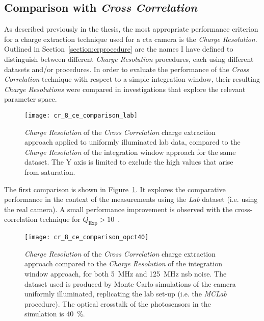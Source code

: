 \subsection{Comparison with \textit{Cross Correlation}}

As described previously in the thesis, the most appropriate performance criterion for a charge extraction technique used for a \gls{cta} camera is the \textit{Charge Resolution}. Outlined in Section~\ref{section:crprocedure} are the names I have defined to distinguish between different \textit{Charge Resolution} procedures, each using different datasets and/or procedures. In order to evaluate the performance of the \textit{Cross Correlation} technique with respect to a simple integration window, their resulting \textit{Charge Resolutions} were compared in investigations that explore the relevant parameter space.

\begin{figure}
  \texttt{[image: cr\_8\_ce\_comparison\_lab]}
  \caption[\textit{Charge Resolution} comparison between \textit{Cross Correlation} and \textit{Window Integration} for \textit{Lab} data.]{\textit{Charge Resolution} of the \textit{Cross Correlation} charge extraction approach applied to uniformly illuminated lab data, compared to the \textit{Charge Resolution} of the integration window approach for the same dataset. The Y axis is limited to exclude the high values that arise from saturation.}
  \label{fig:cr_8_ce_comparison_lab}
\end{figure}

The first comparison is shown in Figure~\ref{fig:cr_8_ce_comparison_lab}. It explores the comparative performance in the context of the measurements using the \textit{Lab} dataset (i.e. using the real camera). A small performance improvement is observed with the cross-correlation technique for $Q_\text{Exp} > 10$~\si{\pe}.

\begin{figure}
  \texttt{[image: cr\_8\_ce\_comparison\_opct40]}
  \caption[\textit{Charge Resolution} comparison between \textit{Cross Correlation} and \textit{Window Integration} for \textit{MCLab} data with an optical crosstalk of \SI{40}{\percent}.]{\textit{Charge Resolution} of the \textit{Cross Correlation} charge extraction approach compared to the \textit{Charge Resolution} of the integration window approach, for both \SI{5}{MHz} and \SI{125}{MHz} \gls{nsb} noise. The dataset used is produced by Monte Carlo simulations of the camera uniformly illuminated, replicating the lab set-up (i.e. the \textit{MCLab} procedure). The optical crosstalk of the photosensors in the simulation is \SI{40}{\percent}.}
  \label{fig:cr_8_ce_comparison_opct40}
\end{figure}

